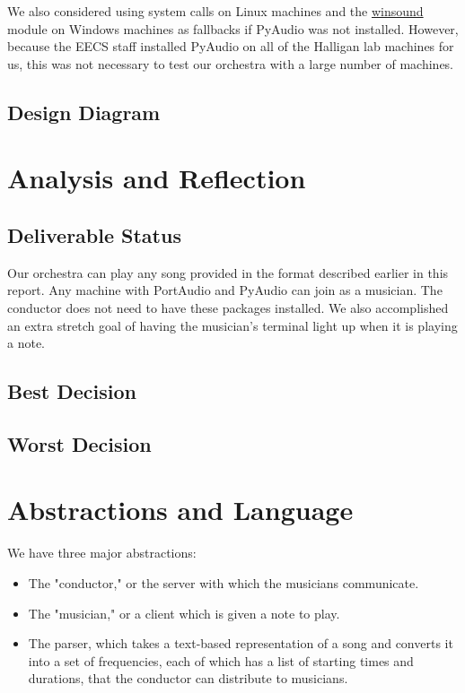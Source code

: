 \documentclass[12pt, letterpaper]{article}
\begin{document}
We also considered using system calls on Linux machines and the
\href{https://docs.python.org/2/library/winsound.html}{winsound} module on Windows machines as
fallbacks if PyAudio was not installed. However, because the EECS staff installed PyAudio on all of
the Halligan lab machines for us, this was not necessary to test our orchestra with a large number
of machines.


\subsection{Design Diagram}


\section{Analysis and Reflection}

\subsection{Deliverable Status}
Our orchestra can play any song provided in the format described earlier in this report. Any machine
with PortAudio and PyAudio can join as a musician. The conductor does not need to have these
packages installed. We also accomplished an extra stretch goal of having the musician's terminal
light up when it is playing a note.

\subsection{Best Decision}

\subsection{Worst Decision}


\section{Abstractions and Language} We have three major abstractions:

\begin{itemize}
\item The "conductor," or the server with which the musicians communicate.
\item The "musician," or a client which is given a note to play.
\item The parser, which takes a text-based representation of a song and converts it into a set of
frequencies, each of which has a list of starting times and durations, that the conductor can
distribute to musicians.
\end{itemize}
\end{document}
